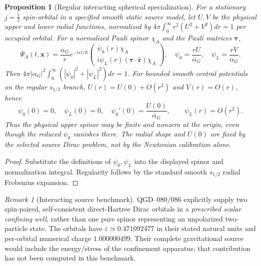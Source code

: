 \documentclass[11pt,a4paper]{article}
\newtheorem{proposition}[theorem]{Proposition}
\theoremstyle{remark}
\newtheorem{remark}[theorem]{Remark}
\begin{document}
\begin{proposition}[Regular interacting spherical specialization]\label{prop:radialpsi}
For a stationary $j=\frac12$ spin-orbital in a specified smooth static
source model, let $U,V$ be the physical upper and lower radial functions,
normalized by $4\pi\int_0^\infty r^2(U^2+V^2)dr=1$ per occupied orbital.
For a normalized Pauli spinor $\chi_A$ and the Pauli matrices $\boldsymbol\tau$,
\begin{equation}\label{eq:radialCal}
\boxed{\Psi_A(t,\mathbf x)
=\frac{\alpha_G}{r}e^{-i\varepsilon t/\hbar}
\begin{pmatrix}\psi_0(r)\chi_A\\
 i\psi_L(r)(\boldsymbol\tau\cdot\hat{\mathbf r})\chi_A\end{pmatrix},\quad
\psi_0=\frac{rU}{\alpha_G},\quad\psi_L=\frac{rV}{\alpha_G}.}
\end{equation}
Then $4\pi|\alpha_G|^2\int_0^\infty(|\psi_0|^2+|\psi_L|^2)dr=1$.
For bounded smooth central potentials on the regular $s_{1/2}$ branch,
$U(r)=U(0)+O(r^2)$ and $V(r)=O(r)$, hence
\begin{equation}\label{eq:originpsi}
\boxed{\psi_0(0)=0,\quad \psi_L(0)=0,\quad
\psi_0'(0)=\frac{U(0)}{\alpha_G},\qquad
\psi_L(r)=O(r^2).}
\end{equation}
Thus the physical upper spinor may be finite and nonzero at the origin,
even though the \emph{reduced} $\psi_0$ vanishes there. The radial shape
and $U(0)$ are fixed by the selected source Dirac problem, not by the
Newtonian calibration alone.
\end{proposition}
\begin{proof}
Substitute the definitions of $\psi_0,\psi_L$ into the displayed spinor
and normalization integral. Regularity follows by the standard smooth
$s_{1/2}$ radial Frobenius expansion.\end{proof}
\begin{remark}[Interacting source benchmark]
QGD--080/086 explicitly supply two spin-paired, self-consistent direct-Hartree
Dirac orbitals in a \emph{prescribed scalar confining well}, rather than
one pure spinor representing an unpolarized two-particle state. The orbitals
have $\varepsilon\simeq0.471092477$ in their stated natural units and
per-orbital numerical charge $1.000000499$. Their complete gravitational
source would include the energy/stress of the confinement apparatus;
that contribution has not been computed in this benchmark.
\end{remark}
\end{document}
